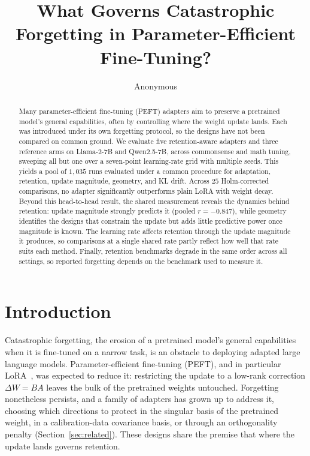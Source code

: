 \documentclass[11pt]{article}
\title{What Governs Catastrophic Forgetting in Parameter-Efficient
Fine-Tuning?}
\author{Anonymous}
\begin{document}
\maketitle

\begin{abstract}
Many parameter-efficient fine-tuning (PEFT) adapters aim to preserve a
pretrained model's general capabilities, often by controlling where the
weight update lands. Each was introduced under its own forgetting protocol,
so the designs have not been compared on common ground. We evaluate five
retention-aware adapters and three reference arms on Llama-2-7B and
Qwen2.5-7B, across commonsense and math tuning, sweeping all but one over a
seven-point learning-rate grid with multiple seeds. This yields a pool of
$1{,}035$ runs evaluated under a common procedure for adaptation, retention,
update magnitude, geometry, and KL drift. Across $25$ Holm-corrected
comparisons, no adapter significantly outperforms plain LoRA with weight
decay. Beyond this head-to-head result, the shared measurement reveals the
dynamics behind retention: update magnitude strongly predicts it (pooled
$r=-0.847$), while geometry identifies the designs that constrain the
update but adds little predictive power once magnitude is known. The
learning rate affects retention through the update magnitude it produces,
so comparisons at a single shared rate partly reflect how well that rate
suits each method. Finally, retention benchmarks degrade in the same order
across all settings, so reported forgetting depends on the benchmark used
to measure it.
\end{abstract}

\section{Introduction}\label{sec:intro}
Catastrophic forgetting, the erosion of a pretrained model's general
capabilities when it is fine-tuned on a narrow task, is an obstacle to deploying adapted large language models. Parameter-efficient fine-tuning
(PEFT), and in particular LoRA~\citep{hu2021lora}, was expected to reduce it:
restricting the update to a low-rank correction $\Delta W = BA$ leaves the
bulk of the pretrained weights untouched. Forgetting nonetheless persists, and
a family of adapters has grown up to address it, choosing which directions to protect in the singular basis of the pretrained weight, in a calibration-data covariance basis, or through an orthogonality penalty (Section~\ref{sec:related}). These designs share the premise that where the update lands governs retention.
\end{document}
